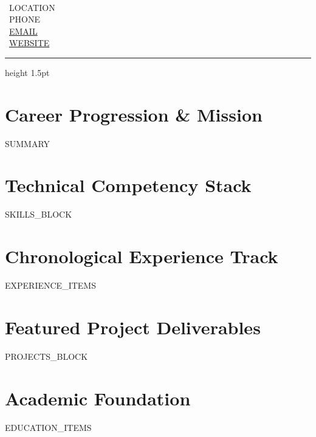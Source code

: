 \documentclass[10pt,letterpaper]{article}
\begin{document}
\begin{minipage}[t]{0.65\textwidth}
  {\LARGE \textbf{}} \\[3pt]
  {\normalsize \textbf{}}
\end{minipage}
\hfill
\begin{minipage}[t]{0.33\textwidth}
  \raggedleft \small
  \faMapMarker* \ {{LOCATION}} \\
  \faPhone \ {{PHONE}} \\
  \faEnvelope \ \href{mailto:{{EMAIL}}}{{{EMAIL}}} \\
  \faGlobe \ \href{https://{{WEBSITE}}}{{{WEBSITE}}}
\end{minipage}

\vspace{6pt}
{\color{amberaccent}\hrule height 1.5pt}
\vspace{6pt}

\section{Career Progression \& Mission}
\small
{{SUMMARY}}

\section{Technical Competency Stack}
\small
{{SKILLS_BLOCK}}

\section{Chronological Experience Track}
\small
{{EXPERIENCE_ITEMS}}

\section{Featured Project Deliverables}
\small
{{PROJECTS_BLOCK}}

\section{Academic Foundation}
\small
{{EDUCATION_ITEMS}}
\end{document}
